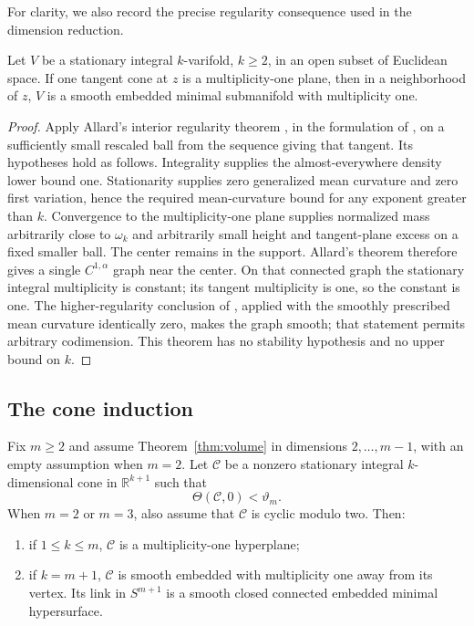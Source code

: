 For clarity, we also record the precise regularity consequence
used in the dimension reduction.

\begin{lemma}\label{lem:cones-allard}
Let $V$ be a stationary integral $k$-varifold, $k\geq2$, in an open
subset of Euclidean space.  If one tangent cone at $z$ is a
multiplicity-one plane, then in a neighborhood of $z$, $V$ is a
smooth embedded minimal submanifold with multiplicity one.
\end{lemma}

\begin{proof}
Apply Allard's interior regularity theorem
\cite[\S8]{Allard1972}, in the formulation of
\cite[Chapter~5, hypotheses~(5.1) and Theorem~5.2]{SimonGMT},
on a sufficiently small rescaled ball from
the sequence giving that tangent.  Its hypotheses hold as follows.
Integrality supplies the almost-everywhere density lower bound one.
Stationarity supplies zero generalized mean curvature and zero
first variation, hence the required mean-curvature bound for any
exponent greater than $k$.  Convergence to the multiplicity-one
plane supplies normalized mass arbitrarily close to $\omega_k$
and arbitrarily small height and tangent-plane excess on a fixed
smaller ball.  The center remains in the support.  Allard's theorem
therefore gives a single $C^{1,\alpha}$ graph near the center.
On that connected graph the stationary integral multiplicity is
constant; its tangent multiplicity is one, so the constant is one.
The higher-regularity conclusion of
\cite[Chapter~5, Theorem~6.1]{SimonGMT}, applied with the smoothly
prescribed mean curvature identically zero, makes the graph smooth;
that statement permits arbitrary codimension. This theorem has
no stability hypothesis and no upper bound on $k$.
\end{proof}

\subsection{The cone induction}

\begin{proposition}\label{prop:low-density-cones}
Fix $m\geq2$ and assume Theorem~\ref{thm:volume} in dimensions
$2,\ldots,m-1$, with an empty assumption when $m=2$.
Let $\mathcal C$ be a nonzero stationary integral
$k$-dimensional cone in $\mathbb R^{k+1}$ such that
\begin{equation}\label{eq:cones-threshold}
 \Theta(\mathcal C,0)<\vartheta_m.
\end{equation}
When $m=2$ or $m=3$, also assume that $\mathcal C$ is cyclic
modulo two.  Then:
\begin{enumerate}[label=\textup{(\roman*)}]
 \item if $1\leq k\leq m$, $\mathcal C$ is a
 multiplicity-one hyperplane;
 \item if $k=m+1$, $\mathcal C$ is smooth embedded with
 multiplicity one away from its vertex.  Its link in $S^{m+1}$
 is a smooth closed connected embedded minimal hypersurface.
\end{enumerate}
\end{proposition}

